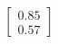 \documentclass[preview]{standalone}
\begin{document}
\begin{align*}
\begin{bmatrix} 0.85 \\ 0.57 \end{bmatrix}
\end{align*}
\end{document}
